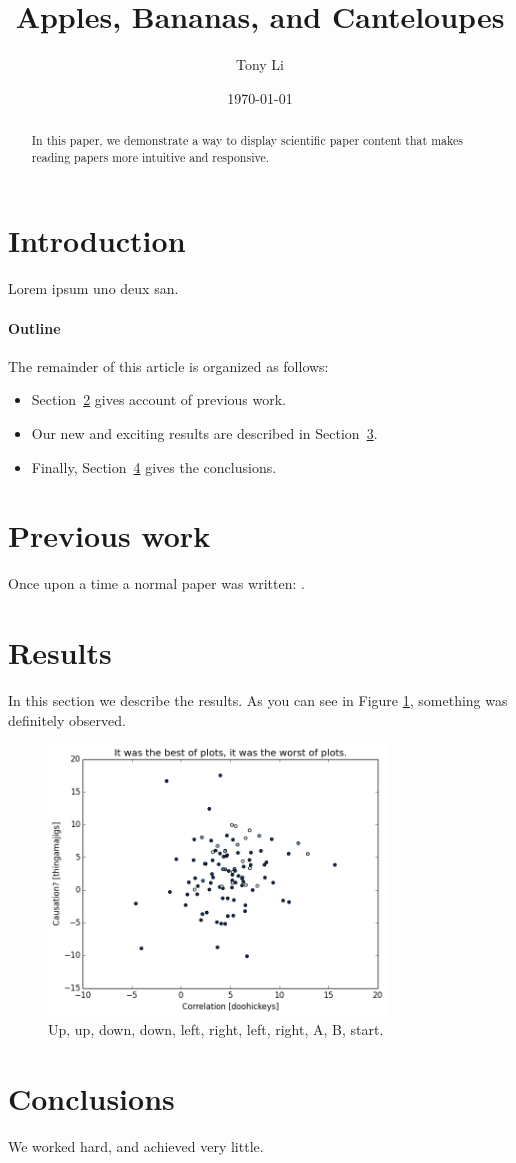 \documentclass{article}
\title{Apples, Bananas, and Canteloupes}
\author{Tony Li}
\date{\today}
\begin{document}
\maketitle

\begin{abstract}
	In this paper, we demonstrate a way to display scientific paper content that makes reading papers more intuitive and responsive.
\end{abstract}

\section{Introduction}
Lorem ipsum uno deux san.

\paragraph{Outline}
The remainder of this article is organized as follows:
\begin{itemize}
	\item Section~\ref{previous work} gives account of previous work.
	\item Our new and exciting results are described in Section~\ref{results}.
	\item Finally, Section~\ref{conclusions} gives the conclusions.
\end{itemize}

\section{Previous work}\label{previous work}
Once upon a time a normal paper was written: \cite{li/etal:2014}.

\section{Results}\label{results}
In this section we describe the results.  As you can see in Figure \ref{fig:plot1}, something was definitely observed.

\begin{figure}[!htbp]
	\centering
	\includegraphics[width=0.8\textwidth]{plot1.png}
    \caption{Up, up, down, down, left, right, left, right, A, B, start.}
    \label{fig:plot1}
\end{figure}


\section{Conclusions}\label{conclusions}
We worked hard, and achieved very little.



\end{document}
